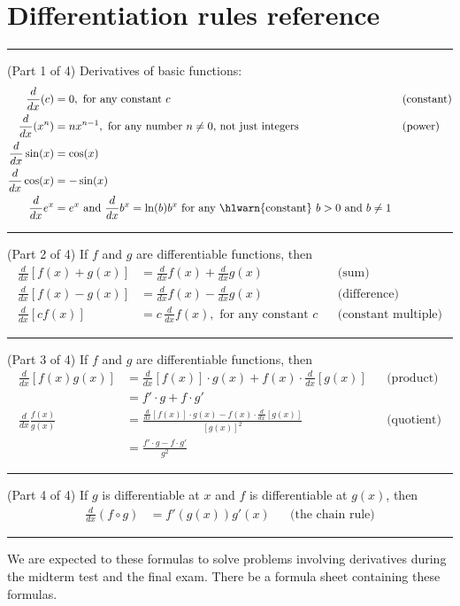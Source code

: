 \documentclass[../main.tex]{subfiles}
\begin{document}
 \section{Differentiation rules reference}

\hrule
(Part 1 of 4) Derivatives of basic functions: 
\begin{align*}
  \frac{d}{dx} (c)
    &= 0, \text{ for any constant \(c\)}
    && \text{(constant)} \\
    \frac{d}{dx} (x^{n})
    &= n x^{n-1}, \text{ for any number \(n \ne 0\), not just integers} 
    && \text{(power)} \\
    \frac{d}{dx} \sin(x)
    &= \cos(x) \\
    \frac{d}{dx} \cos(x)
    &= -\sin(x) \\
  \frac{d}{dx} e^{x} &= e^{x} \text{ and } \frac{d}{dx}b^{x} = \ln(b)b^{x} \text{ for any \hlwarn{constant} } b > 0 \text{ and } b \ne 1
\end{align*}

\hrule

(Part 2 of 4) If \(f\) and \(g\) are differentiable functions, then
\begin{align*}
  \frac{d}{dx} [f(x) + g(x)] 
    &= \frac{d}{dx}f(x) + \frac{d}{dx}g(x)
    && \text{(sum)} \\[1em]
    \frac{d}{dx} [f(x) - g(x)] 
    &= \frac{d}{dx}f(x) - \frac{d}{dx}g(x)
    && \text{(difference)} \\[1em]
    \frac{d}{dx} [c f(x)] 
    &= c \, \frac{d}{dx} f(x), \text{ for any constant \(c\)}
    && \text{(constant multiple)}
\end{align*}

\hrule

(Part 3 of 4) If \(f\) and \(g\) are differentiable functions, then
\begin{align*}
  \frac{d}{dx} [f(x)g(x)] 
    &= { \frac{d}{dx} [f(x)] \cdot g(x)+ f(x) \cdot \frac{d}{dx}[g(x)]}
    && \text{(product)} \\
    &= f' \cdot g + f \cdot g' \\[1em]
    \frac{d}{dx} \frac{f(x)}{g(x)}
    &= {\frac{\frac{d}{dx} [f(x)] \cdot g(x) - f(x) \cdot \frac{d}{dx}[g(x)] }{ [g(x)]^{2} }}
    && \text{(quotient)} \\
    &= \frac{f' \cdot g - f \cdot g'}{g^{2}}
\end{align*}

\hrule

(Part 4 of 4) If \(g\) is differentiable at \(x\) and \(f\) is differentiable at \(g(x)\), then 
\begin{align*}
  \frac{d}{dx} (f \circ g)
    &= f'(g(x)) g'(x)
    &&\text{(the chain rule)}
\end{align*}

\hrule

\faExclamationTriangle{} We are expected to  these formulas to solve problems involving derivatives during the midterm test and the final exam. There  be a formula sheet containing these formulas.
\end{document}
